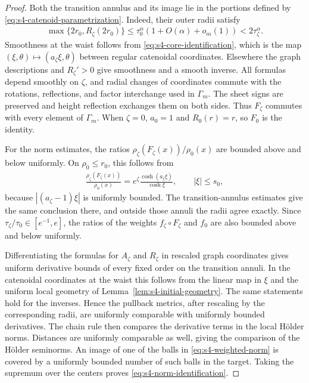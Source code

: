 \documentclass[a4paper,11pt,oneside,reqno]{amsart}
\numberwithin{equation}{section}
\theoremstyle{definition}
\begin{document}
\begin{proof}
    Both the transition annulus and its image lie in the
    portions defined by \eqref{eq:s4-catenoid-parametrization}.
    Indeed, their outer radii satisfy
    \begin{align*}
        \max\{2r_0,R_\zeta(2r_0)\}
        \leq\tau_0^\alpha(1+O(\alpha)+o_m(1))
        <2\tau_\zeta^\alpha.
    \end{align*}
    Smoothness at the waist follows from
    \eqref{eq:s4-core-identification}, which is the map
    $(\xi,\theta)\mapsto(a_\zeta\xi,\theta)$ between regular
    catenoidal coordinates. Elsewhere the graph descriptions
    and $R_\zeta'>0$ give smoothness and a smooth inverse.
    All formulas depend smoothly on $\zeta$, and radial
    changes of coordinates commute with the rotations,
    reflections, and factor interchange used in $\Gamma_m$.
    The sheet signs are preserved and height reflection
    exchanges them on both sides. Thus $F_\zeta$ commutes
    with every element of $\Gamma_m$. When $\zeta=0$,
    $a_0=1$ and $R_0(r)=r$, so $F_0$ is the identity.

    For the norm estimates, the ratios
    $\rho_\zeta(F_\zeta(x))/\rho_0(x)$ are bounded above
    and below uniformly. On $\rho_0\leq r_0$, this follows
    from
    \begin{align*}
        \frac{\rho_\zeta(F_\zeta(x))}{\rho_0(x)}
        =e^\zeta\frac{\cosh(a_\zeta\xi)}{\cosh\xi},
        \qquad |\xi|\leq s_0,
    \end{align*}
    because $|(a_\zeta-1)\xi|$ is uniformly bounded.
    The transition-annulus estimates give the same conclusion
    there, and outside those annuli the radii agree exactly.
    Since $\tau_\zeta/\tau_0\in[e^{-1},e]$, the ratios of
    the weights $f_\zeta\circ F_\zeta$ and $f_0$ are also
    bounded above and below uniformly.

    Differentiating the formulas for $A_\zeta$ and $R_\zeta$
    in rescaled graph coordinates gives uniform derivative
    bounds of every fixed order on the transition annuli.
    In the catenoidal coordinates at the waist this follows
    from the linear map in $\xi$ and the uniform local
    geometry of Lemma~\ref{lem:s4-initial-geometry}.
    The same statements hold for the inverses. Hence the
    pullback metrics, after rescaling by the corresponding
    radii, are uniformly comparable with uniformly bounded
    derivatives. The chain rule then compares the derivative
    terms in the local H\"older norms. Distances are uniformly
    comparable as well, giving the comparison of the H\"older
    seminorms. An image of one of the balls in
    \eqref{eq:s4-weighted-norm} is covered by a uniformly
    bounded number of such balls in the target. Taking the
    supremum over the centers proves
    \eqref{eq:s4-norm-identification}.
\end{proof}
\end{document}
